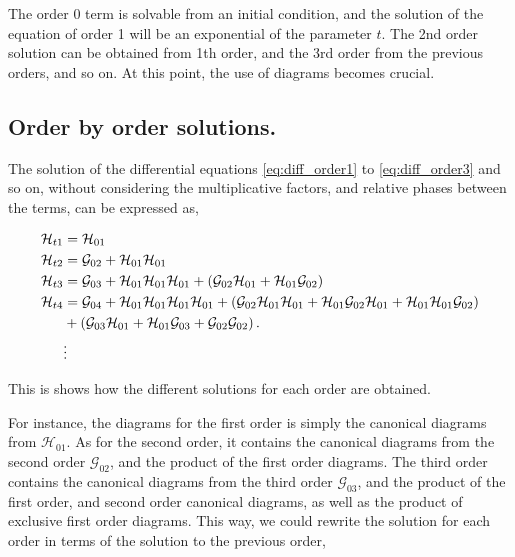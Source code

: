 \documentclass[11pt,a4paper,twoside,pdf]{article}
\numberwithin{equation}{section}
\begin{document}
The order 0 term is solvable from an initial condition, and the solution of the 
equation of order 1 will be an exponential of the parameter $t$. The 2nd order 
solution can be obtained from 1th order, and the 3rd order from the previous orders, 
and so on. At this point, the use of diagrams becomes crucial.


\subsection{Order by order solutions.} \label{sec:orderbyorder_solutions}

The solution of the differential equations \eqref{eq:diff_order1} to \eqref{eq:diff_order3} 
and so on, without considering the multiplicative factors, and relative phases between
the terms, can be expressed as,

\begin{align}
    \mathcal{H}_{t1} & = \mathcal{H}_{01} \\
    \mathcal{H}_{t2} & = \mathcal{G}_{02} + \mathcal{H}_{01} 
    \mathcal{H}_{01}\\
    \mathcal{H}_{t3} & = \mathcal{G}_{03} + \mathcal{H}_{01} \mathcal{H}_{01}
    \mathcal{H}_{01} + \left( \mathcal{G}_{02} \mathcal{H}_{01} + 
    \mathcal{H}_{01} \mathcal{G}_{02} \right)\\
    \mathcal{H}_{t4} & = \mathcal{G}_{04} + \mathcal{H}_{01} \mathcal{H}_{01}
    \mathcal{H}_{01} \mathcal{H}_{01} + \left( \mathcal{G}_{02} 
    \mathcal{H}_{01} \mathcal{H}_{01} +  \mathcal{H}_{01} \mathcal{G}_{02}
    \mathcal{H}_{01} + \mathcal{H}_{01} \mathcal{H}_{01} \mathcal{G}_{02} \right) \nonumber\\
    & + \left( \mathcal{G}_{03} \mathcal{H}_{01} + \mathcal{H}_{01} 
    \mathcal{G}_{03} + \mathcal{G}_{02}\mathcal{G}_{02} \right). \\
    &\vdots  \nonumber
\end{align}

This is shows how the different solutions for each order are obtained. 

For instance, the diagrams for the first order is simply the canonical diagrams from
$\mathcal{H}_{01}$. As for the second order, it contains the canonical diagrams from 
the second order $\mathcal{G}_{02}$, and the product of the first order diagrams. The 
third order contains the canonical diagrams from the third order $\mathcal{G}_{03}$,
and the product of the first order, and second order canonical diagrams, as well as the 
product of exclusive first order diagrams. This way, we could rewrite the solution for 
each order in terms of the solution to the previous order,
\end{document}
